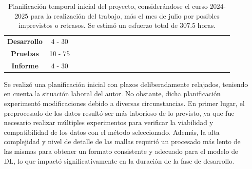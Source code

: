 \begin{table}[h]
{\begin{tabular}{|c|c|ccccccccccccccccccccccc}
    \textbf{Desarrollo} & 4 - 30 & \cellcolor[HTML]{FFCCC9} & \cellcolor[HTML]{FFCCC9} & \cellcolor[HTML]{FFCCC9} & \cellcolor[HTML]{FFCCC9} &  &  &  &  &  &  &  &  &  &  &  &  &  &  &  &  &  & \multicolumn{1}{c|}{} &  \\ \cline{1-24}
    \textbf{Pruebas} & 10 - 75 &  &  &  &  & \cellcolor[HTML]{FFCCC9} & \cellcolor[HTML]{FFCCC9} & \cellcolor[HTML]{FFCCC9} & \cellcolor[HTML]{FFCCC9} & \cellcolor[HTML]{FFCCC9} & \cellcolor[HTML]{FFCCC9} & \cellcolor[HTML]{FFCCC9} & \cellcolor[HTML]{FFCCC9} & \cellcolor[HTML]{FFCCC9} & \cellcolor[HTML]{FFCCC9} &  &  &  &  &  &  &  & \multicolumn{1}{c|}{} &  \\ \cline{1-24}
    \textbf{Informe} & 4 - 30 & \multicolumn{1}{l}{} & \multicolumn{1}{l}{} & \multicolumn{1}{l}{} & \multicolumn{1}{l}{} & \multicolumn{1}{l}{} & \multicolumn{1}{l}{} & \multicolumn{1}{l}{} & \multicolumn{1}{l}{} & \multicolumn{1}{l}{} & \multicolumn{1}{l}{} & \multicolumn{1}{l}{} & \multicolumn{1}{l}{} & \multicolumn{1}{l}{} & \multicolumn{1}{l}{} & \multicolumn{1}{l}{\cellcolor[HTML]{FFCCC9}} & \multicolumn{1}{l}{\cellcolor[HTML]{FFCCC9}} & \multicolumn{1}{l}{\cellcolor[HTML]{FFCCC9}} & \multicolumn{1}{l}{\cellcolor[HTML]{FFCCC9}} & \multicolumn{1}{l}{} & \multicolumn{1}{l}{} & \multicolumn{1}{l}{} & \multicolumn{1}{l|}{} & \multicolumn{1}{l}{} \\ \cline{1-24}
    \end{tabular}%
}
\caption[Planificación temporal inicial del proyecto]{Planificación temporal inicial del proyecto, considerándose el curso 2024-2025 para la realización del trabajo, más el mes de julio por posibles imprevistos o retrasos. Se estimó un esfuerzo total de 307.5 horas.}
\label{table:plan1}
\end{table}

Se realizó una planificación inicial con plazos deliberadamente relajados, teniendo en cuenta la situación laboral del autor. No obstante, dicha planificación experimentó modificaciones debido a diversas circunstancias. En primer lugar, el preprocesado de los datos resultó ser más laborioso de lo previsto, ya que fue necesario realizar múltiples experimentos para verificar la viabilidad y compatibilidad de los datos con el método seleccionado. Además, la alta complejidad y nivel de detalle de las mallas requirió un procesado más lento de las mismas para obtener un formato consistente y adecuado para el modelo de DL, lo que impactó significativamente en la duración de la fase de desarrollo.

